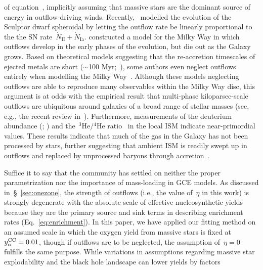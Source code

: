 of equation~, implicitly assuming that massive stars are
the dominant source of energy in outflow-driving winds.
Recently,~\citet{delosReyes2022} modelled the evolution of the Sculptor dwarf
spheroidal by letting the outflow rate be linearly proportional to the the
SN rate~$\dot{N}_\text{II} + \dot{N}_\text{Ia}$.
\citet*{Kobayashi2020} constructed a model for the Milky Way in which
outflows develop in the early phases of the evolution, but die out as the
Galaxy grows.
Based on theoretical models suggesting that the re-accretion timescales of
ejected metals are short ($\sim$100 Myr;~\citealp{Melioli2008, Melioli2009,
Spitoni2008, Spitoni2009}), some authors even neglect outflows entirely when
modelling the Milky Way~\citep[e.g.,][]{Minchev2013, Minchev2014, Minchev2017,
Spitoni2019, Spitoni2021}.
Although these models neglecting outflows are able to reproduce many
observables within the Milky Way disc, this argument is at odds with the
empirical result that multi-phase kiloparsec-scale outflows are ubiquitous
around galaxies of a broad range of stellar masses (see, e.g., the recent
review in~\citealt{Veilleux2020}).
Furthermore, measurements of the deuterium abundance (\citealp{Linsky2006};
\citealp*{Prodanovic2010}) and the~$^3$He/$^4$He ratio~\citep{Balser2018} in
the local ISM indicate near-primordial values.
These results indicate that much of the gas in the Galaxy has not been
processed by stars, further suggesting that ambient ISM is readily swept up in
outflows and replaced by unprocessed baryons through
accretion~\citep{Weinberg2017a, Cooke2022}.
\par
Suffice it to say that the community has settled on neither the proper
parametrization nor the importance of mass-loading in GCE models.
As discussed in~\S~\ref{sec:onezone}, the strength of outflows (i.e., the value
of~$\eta$ in this work) is strongly degenerate with the absolute scale of
effective nucleosynthetic yields because they are the primary source and sink
terms in describing enrichment rates (Eq.~\ref{eq:enrichment}).
In this paper, we have applied our fitting method on an assumed scale in which
the oxygen yield from massive stars is fixed at~$y_\alpha^\text{CC} = 0.01$, though if
outflows are to be neglected, the assumption of~$\eta = 0$ fulfills the same
purpose.
While variations in assumptions regarding massive star explodability and the
black hole landscape can lower yields by factors
